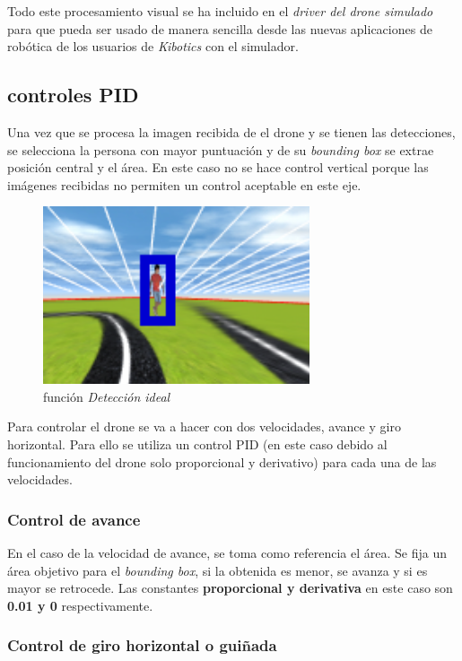 Todo este procesamiento visual se ha incluido en el \textit{driver del drone simulado} para que pueda ser usado de manera sencilla desde las nuevas aplicaciones de robótica de los usuarios de \textit{Kibotics} con el simulador.
\subsection*{controles PID}
Una vez que se procesa la imagen recibida de el drone y se tienen las detecciones, se selecciona la persona con mayor puntuación y de su \textit{bounding box} se extrae posición central y el área. En este caso no se hace control vertical porque las imágenes recibidas no permiten un control aceptable en este eje.
\begin{figure}[H]
  \begin{center}
    \includegraphics[width=0.7\textwidth]{figures/simulado/sim3.png}
		\caption{función \textit{Detección ideal}}
		\label{fig:sim3}
		\end{center}
\end{figure}

Para controlar el drone se va a hacer con dos velocidades, avance y giro horizontal. Para ello se utiliza un control PID (en este caso debido al funcionamiento del drone solo proporcional y derivativo) para cada una de las velocidades.
\subsubsection*{Control de avance}

En el caso de la velocidad de avance, se toma como referencia el área. Se fija un área objetivo para el \textit{bounding box}, si la obtenida es menor, se avanza y si es mayor se retrocede. Las constantes \textbf{proporcional y derivativa} en este caso son \textbf{0.01 y 0} respectivamente.

\subsubsection*{Control de giro horizontal o guiñada}

